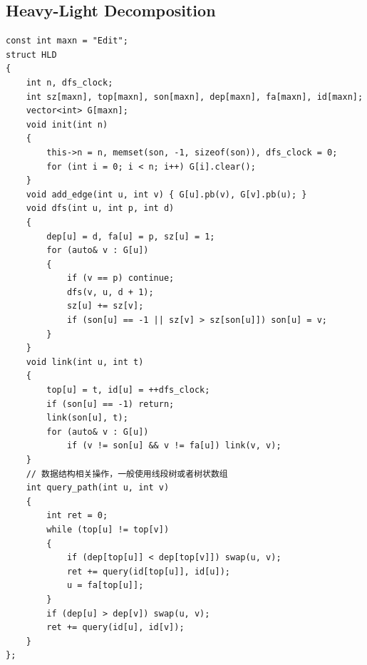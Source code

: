 \documentclass[twoside]{article}
\begin{document}
\subsection{Heavy-Light Decomposition}
\begin{lstlisting}
const int maxn = "Edit";
struct HLD
{
    int n, dfs_clock;
    int sz[maxn], top[maxn], son[maxn], dep[maxn], fa[maxn], id[maxn];
    vector<int> G[maxn];
    void init(int n)
    {
        this->n = n, memset(son, -1, sizeof(son)), dfs_clock = 0;
        for (int i = 0; i < n; i++) G[i].clear();
    }
    void add_edge(int u, int v) { G[u].pb(v), G[v].pb(u); }
    void dfs(int u, int p, int d)
    {
        dep[u] = d, fa[u] = p, sz[u] = 1;
        for (auto& v : G[u])
        {
            if (v == p) continue;
            dfs(v, u, d + 1);
            sz[u] += sz[v];
            if (son[u] == -1 || sz[v] > sz[son[u]]) son[u] = v;
        }
    }
    void link(int u, int t)
    {
        top[u] = t, id[u] = ++dfs_clock;
        if (son[u] == -1) return;
        link(son[u], t);
        for (auto& v : G[u])
            if (v != son[u] && v != fa[u]) link(v, v);
    }
    // 数据结构相关操作，一般使用线段树或者树状数组
    int query_path(int u, int v)
    {
        int ret = 0;
        while (top[u] != top[v])
        {
            if (dep[top[u]] < dep[top[v]]) swap(u, v);
            ret += query(id[top[u]], id[u]);
            u = fa[top[u]];
        }
        if (dep[u] > dep[v]) swap(u, v);
        ret += query(id[u], id[v]);
    }
};
\end{lstlisting}
\end{document}
